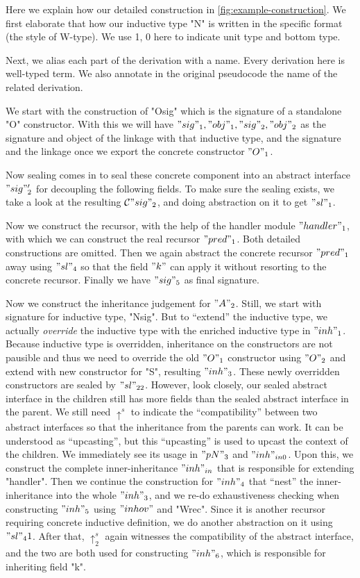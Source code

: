 Here we explain how  our detailed construction in
\cref{fig:example-construction}. We first elaborate that
how our inductive type "N" is written in the specific format (the style
of W-type). We use 1, 0 here to indicate unit type and bottom type. 

Next, we alias each part of the derivation with a name. Every derivation
here is well-typed term. We also annotate in the original pseudocode the
name of the related derivation. 

We start with the construction of "Osig" which is the signature of a
standalone "O" constructor. With this we will have $"sig"_1, "obj"_1,
"sig"_2, "obj"_2$ as the signature and object of the linkage with that
inductive type, and the signature and the linkage once we export the
concrete constructor $"O"_1$. 

Now sealing comes in to seal these concrete component into an abstract
interface $"sig"_2'$ for decoupling the following fields. To make sure
the sealing exists, we take a look at the resulting ${\mathcal{C}} "sig"_2$, and
doing abstraction on it to get $"sl"_1$. 

Now we construct the recursor, with the help of the handler module
$"handler"_1$, with which we can construct the real recursor $"pred"_1$.
Both detailed constructions are omitted. Then we again abstract the
concrete recursor $"pred"_1$ away using $"sl"_4$ so that the field $"k"$
can apply it without resorting to the concrete recursor. Finally we
have $"sig"_5$ as final signature.

Now we construct the inheritance judgement for $"A"_2$. Still, we start
with signature for inductive type, "Nsig". But to ``extend'' the
inductive type, we actually \textit{override} the inductive type with
the enriched inductive type in $"inh"_1$. Because inductive type is
overridden, inheritance on the constructors are not pausible and thus we
need to override the old $"O"_1$ constructor using $"O"_2$ and extend
with new constructor for "S", resulting $"inh"_3$. These newly
overridden constructors are sealed by $"sl"_{22}$. However, look
closely, our sealed abstract interface in the children still has more
fields than the sealed abstract interface in the parent. We still need
$\uparrow^s$ to indicate the ``compatibility'' between two abstract
interfaces so that the inheritance from the parents can work. It can be
understood as ``upcasting'', but this ``upcasting'' is used to upcast
the context of the children. We immediately see its usage in $"pN"_3$
and $"inh"_{in0}$. Upon this, we construct the complete
inner-inheritance $"inh"_{in}$ that is responsible for extending
"handler". Then we continue the construction for $"inh"_4$ that ``nest''
the inner-inheritance into the whole $"inh"_3$, and we re-do
exhaustiveness checking when constructing $"inh"_5$ using $"inhov"$ and
"Wrec". Since it is another recursor requiring concrete inductive
definition, we do another abstraction on it using $"sl"_41$. After that,
$\uparrow^s_2$ again witnesses the compatibility of the abstract
interface, and the two are both used for constructing $"inh"_6$, which
is responsible for inheriting field "k". 

